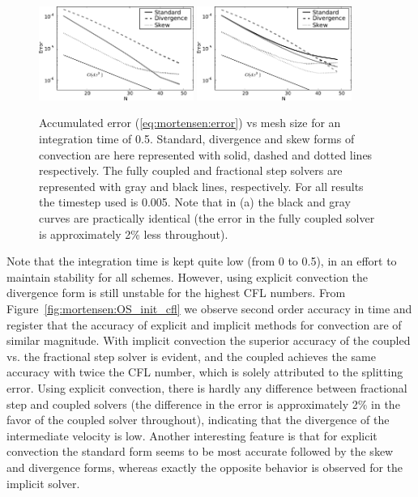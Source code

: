 \begin{figure}
 \includegraphics[width=0.45\textwidth]{chapters/mortensen/pdf/OS_init_dx_1.pdf}
%
 \includegraphics[width=0.45\textwidth]{chapters/mortensen/pdf/OS_init_dx_0.pdf}
%
 \caption{Accumulated error (\eqref{eq:mortensen:error}) vs mesh size for an integration time of 0.5. Standard, divergence and skew forms of convection are here represented with solid, dashed and dotted lines respectively. The fully coupled and fractional step solvers are represented with gray and black lines, respectively. For all results the timestep used is 0.005. Note that in (a) the black and gray curves are practically identical (the error in the fully coupled solver is approximately 2\% less throughout). }
\label{fig:mortensen:OS_init_dx}
\end{figure}
Note that the integration time is kept quite low (from 0 to 0.5), in an effort to maintain stability for all schemes. However, using explicit convection the divergence form is still unstable for the highest CFL numbers. From Figure~\ref{fig:mortensen:OS_init_cfl} we observe second order accuracy in time and register that the accuracy of explicit and implicit methods for convection are of similar magnitude. With implicit convection the superior accuracy of the coupled vs. the fractional step solver is evident, and the coupled achieves the same accuracy with twice the CFL number, which is solely attributed to the splitting error. Using explicit convection, there is hardly any difference between fractional step and coupled solvers (the difference in the error is approximately 2\% in the favor of the coupled solver throughout), indicating that the divergence of the intermediate velocity is low. Another interesting feature is that for explicit convection the standard form seems to be most accurate followed by the skew and divergence forms, whereas exactly the opposite behavior is observed for the implicit solver.

